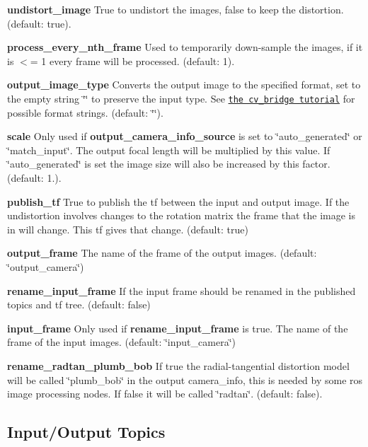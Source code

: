 \begin{DoxyItemize}
\item {\bfseries undistort\+\_\+image} True to undistort the images, false to keep the distortion. (default\+: true).
\item {\bfseries process\+\_\+every\+\_\+nth\+\_\+frame} Used to temporarily down-\/sample the images, if it is $<$= 1 every frame will be processed. (default\+: 1).
\item {\bfseries output\+\_\+image\+\_\+type} Converts the output image to the specified format, set to the empty string \char`\"{}\char`\"{} to preserve the input type. See \href{http://wiki.ros.org/cv_bridge/Tutorials/UsingCvBridgeToConvertBetweenROSImagesAndOpenCVImages}{\tt the cv\+\_\+bridge tutorial} for possible format strings. (default\+: \char`\"{}\char`\"{}).
\item {\bfseries scale} Only used if {\bfseries output\+\_\+camera\+\_\+info\+\_\+source} is set to \char`\"{}auto\+\_\+generated\char`\"{} or \char`\"{}match\+\_\+input\char`\"{}. The output focal length will be multiplied by this value. If \char`\"{}auto\+\_\+generated\char`\"{} is set the image size will also be increased by this factor. (default\+: 1.).
\item {\bfseries publish\+\_\+tf} True to publish the tf between the input and output image. If the undistortion involves changes to the rotation matrix the frame that the image is in will change. This tf gives that change. (default\+: true)
\item {\bfseries output\+\_\+frame} The name of the frame of the output images. (default\+: \char`\"{}output\+\_\+camera\char`\"{})
\item {\bfseries rename\+\_\+input\+\_\+frame} If the input frame should be renamed in the published topics and tf tree. (default\+: false)
\item {\bfseries input\+\_\+frame} Only used if {\bfseries rename\+\_\+input\+\_\+frame} is true. The name of the frame of the input images. (default\+: \char`\"{}input\+\_\+camera\char`\"{})
\item {\bfseries rename\+\_\+radtan\+\_\+plumb\+\_\+bob} If true the radial-\/tangential distortion model will be called \char`\"{}plumb\+\_\+bob\char`\"{} in the output camera\+\_\+info, this is needed by some ros image processing nodes. If false it will be called \char`\"{}radtan\char`\"{}. (default\+: false).
\end{DoxyItemize}\hypertarget{md_vision_layer_image_undistort_README_autotoc_md98}{}\subsection{Input/\+Output Topics}\label{md_vision_layer_image_undistort_README_autotoc_md98}
